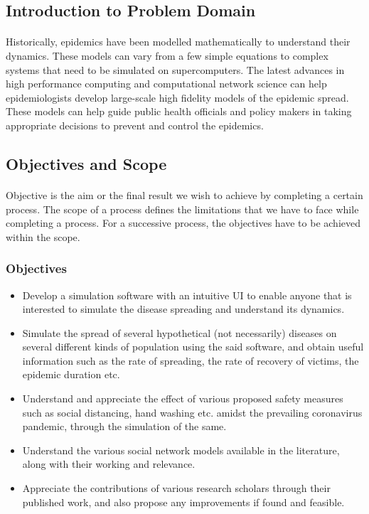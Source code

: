 \documentclass[12pt, a4paper]{extarticle}
\begin{document}
        \subsection{Introduction to Problem Domain}
            \paragraph{} Historically, epidemics have been modelled mathematically to understand their dynamics. These models can vary from a few simple equations to complex systems that need to be simulated on supercomputers. The latest advances in high performance computing and computational network science can help epidemiologists develop large-scale high fidelity models of the epidemic spread. These models can help guide public health officials and policy makers in taking appropriate decisions to prevent and control the epidemics.
        \subsection{Objectives and Scope}
            \paragraph{} Objective is the aim or the final result we wish to achieve by completing a certain process. The scope of a process defines the limitations that we have to face while completing a process. For a successive process, the objectives have to be achieved within the scope.
            \subsubsection{Objectives}
                \begin{itemize}
                    \item Develop a simulation software with an intuitive UI to enable anyone that is interested to simulate the disease spreading and understand its dynamics.
                    \item Simulate the spread of several hypothetical (not necessarily) diseases on several different kinds of population using the said software, and obtain useful information such as the rate of spreading, the rate of recovery of victims, the epidemic duration etc.
                    \item Understand and appreciate the effect of various proposed safety measures such as social distancing, hand washing etc. amidst the prevailing coronavirus pandemic, through the simulation of the same.
                    \item Understand the various social network models available in the literature, along with their working and relevance.
                    \item Appreciate the contributions of various research scholars through their published work, and also propose any improvements if found and feasible.
                \end{itemize}
\end{document}
